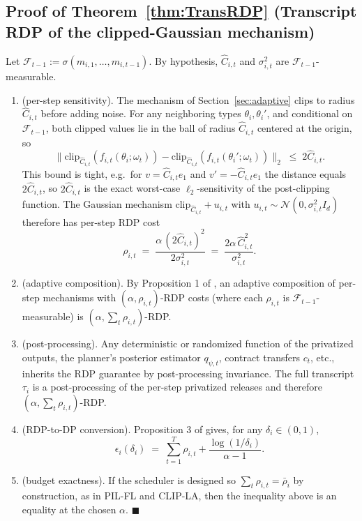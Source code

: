 \documentclass{article}
\begin{document}
\subsection{Proof of Theorem~\ref{thm:TransRDP} (Transcript RDP of the clipped-Gaussian mechanism)}
\label{app:TransRDP}

Let $\mathcal{F}_{t-1} := \sigma(m_{i,1}, \ldots, m_{i,t-1})$. By hypothesis, $\hat C_{i,t}$ and $\sigma_{i,t}^2$ are $\mathcal{F}_{t-1}$-measurable.

\begin{enumerate}
    \item[Step 1] (per-step sensitivity). The mechanism of Section~\ref{sec:adaptive} clips to radius $\hat C_{i,t}$ before adding noise. For any neighboring types $\theta_i, \theta_i'$, and conditional on $\mathcal{F}_{t-1}$, both clipped values lie in the ball of radius $\hat C_{i,t}$ centered at the origin, so $$\|\mathrm{clip}_{\hat C_{i,t}}(f_{i,t}(\theta_i; \omega_t)) - \mathrm{clip}_{\hat C_{i,t}}(f_{i,t}(\theta_i'; \omega_t))\|_2 \;\le\; 2\hat C_{i,t}.$$ This bound is tight, e.g.\ for $v = \hat C_{i,t} e_1$ and $v' = -\hat C_{i,t} e_1$ the distance equals $2\hat C_{i,t}$, so $2\hat C_{i,t}$ is the exact worst-case $\ell_2$-sensitivity of the post-clipping function. The Gaussian mechanism $\mathrm{clip}_{\hat C_{i,t}} + u_{i,t}$ with $u_{i,t} \sim \mathcal{N}(0, \sigma_{i,t}^2 I_d)$ therefore has per-step RDP cost $$\rho_{i,t} \;=\; \frac{\alpha\, (2\hat C_{i,t})^2}{2\sigma_{i,t}^2} \;=\; \frac{2\alpha\,\hat C_{i,t}^2}{\sigma_{i,t}^2}.$$
    \item[Step 2] (adaptive composition). By Proposition 1 of \citet{mironov2017renyi}, an adaptive composition of per-step mechanisms with $(\alpha, \rho_{i,t})$-RDP costs (where each $\rho_{i,t}$ is $\mathcal{F}_{t-1}$-measurable) is $(\alpha, \sum_t \rho_{i,t})$-RDP.
    \item[Step 3] (post-processing). Any deterministic or randomized function of the privatized outputs, the planner's posterior estimator $q_{\psi,t}$, contract transfers $c_t$, etc., inherits the RDP guarantee by post-processing invariance. The full transcript $\tau_i$ is a post-processing of the per-step privatized releases and therefore $(\alpha, \sum_t \rho_{i,t})$-RDP. 
    \item[Step 4] (RDP-to-DP conversion). Proposition 3 of \citet{mironov2017renyi} gives, for any $\delta_i \in (0,1)$, $$\epsilon_i(\delta_i) \;=\; \sum_{t=1}^T \rho_{i,t} + \frac{\log(1/\delta_i)}{\alpha - 1}.$$
    \item[Step 5] (budget exactness). If the scheduler is designed so $\sum_t \rho_{i,t} = \bar\rho_i$ by construction, as in PIL-FL and CLIP-LA, then the inequality above is an equality at the chosen $\alpha$. $\blacksquare$
\end{enumerate}
\end{document}
